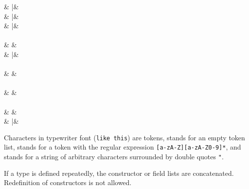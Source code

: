 \begin{grammar}
& \bar &  \\
& \bar &  \\
& \bar & \term{(}  \term{)} \\
\\
 & \produces &  \\
& \bar &  \term{|}  \\
\\
 & \produces &  \term{:}  \\
\\
 & \produces &  \term{:}  \\
\\
 & \produces &  \\
& \bar & \term{[}  \term{]} \\
\end{grammar}
Characters in typewriter font ({\tt like this}) are tokens,
{\emptystring} stands for an empty token list,
 stands for a token with the regular expression
\verb![a-zA-Z][a-zA-Z0-9]*!,
and  stands for a string of arbitrary characters
surrounded by double quotes \verb+"+.
\par
If a type is defined repeatedly, the constructor or field lists
are concatenated. Redefinition of constructors is not allowed.
